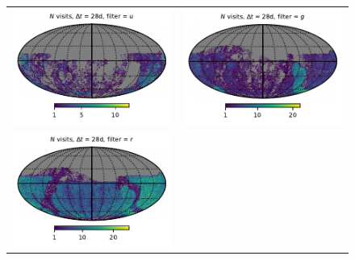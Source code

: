 \documentclass[preprintm,linenumbers]{aastex631}
\begin{document}
  		\begin{figure}
			\centering
			\begin{tabular}{@{}c@{}c@{}}
				\includegraphics{results/skymaps/skymap_first_year_one_snap_v4_0_10yrs_db_noDD_noTwi_tscale-28_nside-256_doAllTemplateMetrics_reduceCount_u_noDD_noTwi.pdf} &
				\includegraphics{results/skymaps/skymap_first_year_one_snap_v4_0_10yrs_db_noDD_noTwi_tscale-28_nside-256_doAllTemplateMetrics_reduceCount_g_noDD_noTwi.pdf} \\
				\includegraphics{results/skymaps/skymap_first_year_one_snap_v4_0_10yrs_db_noDD_noTwi_tscale-28_nside-256_doAllTemplateMetrics_reduceCount_r_noDD_noTwi.pdf} &

\end{tabular}
\end{figure}
\end{document}
